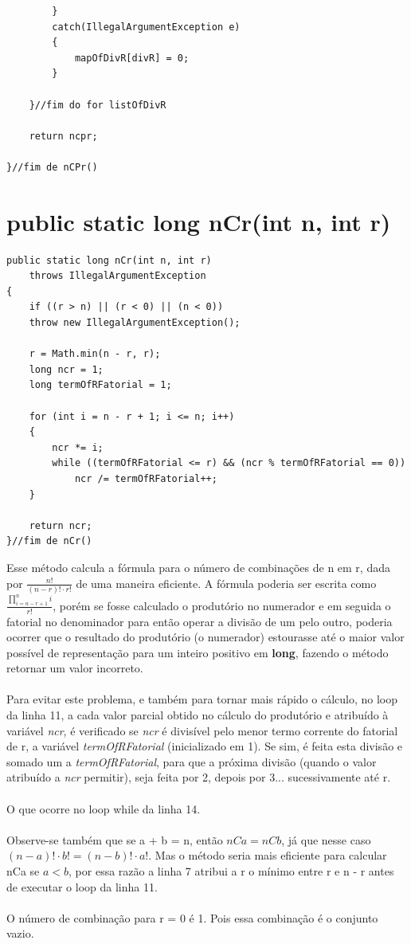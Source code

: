 \documentclass[a4paper,12pt,openany]{book}
\begin{document}
\begin{lstlisting}
		}
		catch(IllegalArgumentException e)
		{
			mapOfDivR[divR] = 0;
		}
	
	}//fim do for listOfDivR
	
	return ncpr;

}//fim de nCPr()
\end{lstlisting}

\section*{public static long nCr(int n, int r)}


\begin{lstlisting}
public static long nCr(int n, int r)
	throws IllegalArgumentException
{
	if ((r > n) || (r < 0) || (n < 0))
	throw new IllegalArgumentException();
	
	r = Math.min(n - r, r);
	long ncr = 1;
	long termOfRFatorial = 1;
	
	for (int i = n - r + 1; i <= n; i++)
	{
		ncr *= i;
		while ((termOfRFatorial <= r) && (ncr % termOfRFatorial == 0))
			ncr /= termOfRFatorial++;
	}
	
	return ncr;
}//fim de nCr()
\end{lstlisting}

Esse método calcula a fórmula para o número de combinações de n em r, dada por $ \frac{n!}{(n-r)! \cdot r!} $ de uma maneira eficiente.  A fórmula poderia ser escrita como $ \frac{\displaystyle \prod_{i = n - r + 1}^{n} i}{r!} $, porém se fosse calculado o produtório no numerador e em seguida o fatorial no denominador para então operar a divisão de um pelo outro, poderia ocorrer que o resultado do produtório (o numerador) estourasse até o maior valor possível de representação para um inteiro positivo em \textbf{long}, fazendo o método retornar um valor incorreto.
\\
\\
Para evitar este problema, e também para tornar mais rápido o cálculo, no loop da linha 11, a cada valor parcial obtido no cálculo do produtório e atribuído à variável \textit{ncr}, é verificado se \textit{ncr} é divisível pelo menor termo corrente do fatorial de r, a variável \textit{termOfRFatorial}  (inicializado em 1). Se sim, é feita esta divisão e somado um a \textit{termOfRFatorial}, para que a próxima divisão (quando o valor atribuído a \textit{ncr} permitir), seja feita por 2, depois por 3... sucessivamente até r.
\\
\\
O que ocorre no loop while da linha 14.
\\
\\
Observe-se também que se a + b = n, então $ nCa = nCb $, já que nesse caso $ (n-a)! \cdot b!  = (n-b)! \cdot a! $. Mas o método seria mais eficiente para calcular nCa se $ a < b $, por essa razão a linha 7 atribui a r o mínimo entre r e n - r antes de executar o loop da linha 11.
\\
\\
O número de combinação para r = 0 é 1. Pois essa combinação é o conjunto vazio.
\end{document}
